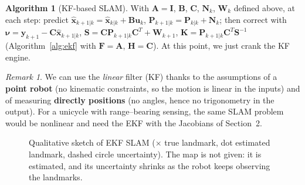 \documentclass[11pt,a4paper]{article}
\theoremstyle{definition}
\newtheorem{algorithm}[definition]{Algorithm}
\theoremstyle{plain}
\theoremstyle{remark}
\newtheorem*{remark}{Remark}
\newcommand{\robot}[3][fill=white]{\begin{scope}[shift={(#2)},rotate=#3]\draw[#1,thick] (0.24,0)--(-0.16,0.15)--(-0.16,-0.15)--cycle;\end{scope}}
\begin{document}
\begin{algorithm}[KF-based SLAM]
With $\bm A=\bm I$, $\bm B$, $\bm C$, $\bm N_k$, $\bm W_k$ defined above, at each step: predict $\hat{\bm x}_{k+1|k}=\hat{\bm x}_{k|k}+\bm B\bm u_k$, $\bm P_{k+1|k}=\bm P_{k|k}+\bm N_k$; then correct with $\bm\nu=\bm y_{k+1}-\bm C\hat{\bm x}_{k+1|k}$, $\bm S=\bm C\bm P_{k+1|k}\bm C^T+\bm W_{k+1}$, $\bm K=\bm P_{k+1|k}\bm C^T\bm S^{-1}$ (Algorithm~\ref{alg:ekf} with $\bm F=\bm A$, $\bm H=\bm C$). At this point, we just crank the KF engine.
\end{algorithm}

\begin{remark}
We can use the \emph{linear} filter (KF) thanks to the assumptions of a \textbf{point robot} (no kinematic constraints, so the motion is linear in the inputs) and of measuring \textbf{directly positions} (no angles, hence no trigonometry in the output). For a unicycle with range--bearing sensing, the same SLAM problem would be nonlinear and need the EKF with the Jacobians of Section~2.
\end{remark}

\begin{figure}[H]
\centering
\begin{minipage}[t]{0.48\linewidth}
\centering
{}
\end{minipage}\hfill
\begin{minipage}[t]{0.48\linewidth}
\centering
{}
\end{minipage}
\caption{Qualitative sketch of EKF SLAM ($\times$ true landmark, dot estimated landmark, dashed circle uncertainty). The map is not given: it is estimated, and its uncertainty shrinks as the robot keeps observing the landmarks.}
\label{fig:slam}
\end{figure}
\end{document}

